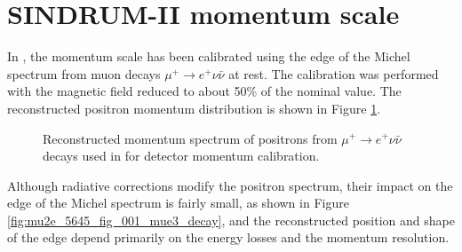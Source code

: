 \newpage
\section {SINDRUM-II momentum scale }

In \cite{sindrum_ii:Bertl2006}, the momentum scale has been calibrated using
the edge of the Michel spectrum from muon decays $\mu^+ \rightarrow e^+ \nu \bar{\nu}$
at rest. The calibration was performed with the magnetic field reduced to about 50\%
of the nominal value. The reconstructed positron momentum distribution is shown
in Figure \ref{fig:sindrum_ii_fig_08_fit}.

\begin{figure}
\caption{
  \label{fig:sindrum_ii_fig_08_fit}
  Reconstructed momentum spectrum of positrons from $\mu^+ \rightarrow e^+ \nu \bar{\nu}$
  decays used in \cite{sindrum_ii:Bertl2006} for detector momentum calibration.
}
\end{figure}

Although radiative corrections modify the positron spectrum, their impact on the edge of the Michel spectrum
is fairly small, as shown in Figure \ref{fig:mu2e_5645_fig_001_mue3_decay}, and the reconstructed
position and shape of the edge depend primarily on the energy losses and the momentum resolution.

